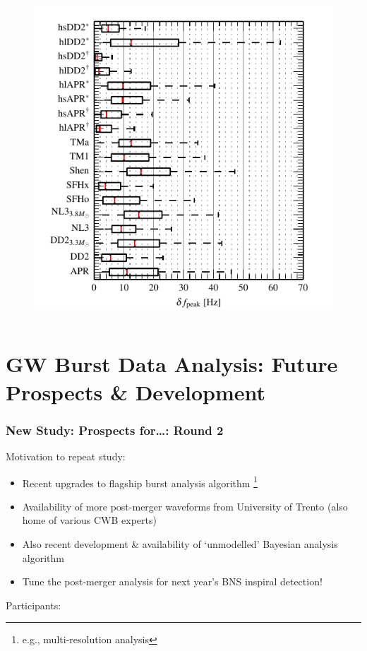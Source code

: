 \documentclass[serif,mathserif,10pt]{beamer}
\let\oldframetitle\frametitle%
\renewcommand{\frametitle}[1]{%
      \oldframetitle{#1}\setstretch{1.2}}
\begin{document}
\begin{frame}
\begin{columns}[]
        \begin{center}
            \vspace{-0.5cm}
            \begin{figure}
                \includegraphics[width=\columnwidth]{figures/deltaFpeak.pdf}
            \end{figure}
        \end{center}

    \end{columns}

\end{frame}

\section{GW Burst Data Analysis: Future Prospects \& Development}

\begin{frame}
    \frametitle{New Study: Prospects for\dots: Round 2}
    Motivation to repeat study:
    \begin{itemize}
        \item Recent upgrades to flagship burst analysis algorithm \footnote{e.g.,
            multi-resolution analysis}
        \item Availability of more post-merger waveforms from University of Trento (also
            home of various CWB experts)
        \item Also recent development \& availability of `unmodelled' Bayesian
            analysis algorithm
        \item Tune the post-merger analysis for next year's BNS inspiral detection!
    \end{itemize}

    Participants: 

\end{frame}
\end{document}
